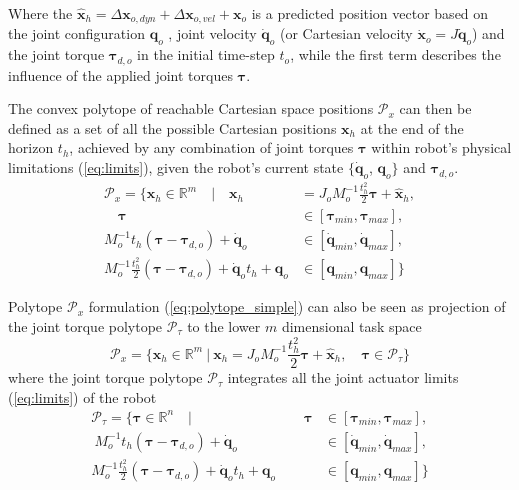 Where the $\hat{\bm{x}}_{h}\! =\!\Delta \bm{x}_{o,dyn}\! +\! \Delta \bm{x}_{o,vel} + \bm{x}_{o}$ is a predicted position vector based on the joint configuration $\bm{q}_o$ , joint velocity $\dot{\bm{q}}_o$ (or Cartesian velocity  $\dot{\bm{x}}_o\!=\!J\dot{\bm{q}}_o$) and the joint torque $\bm{\tau}_{d,o}$ in the initial time-step $t_o$, while the first term describes the influence of the applied joint torques $\bm{\tau}$.

The convex polytope of reachable Cartesian space positions $\mathcal{P}_x$ can then be defined as a set of all the possible Cartesian positions $\bm{x}_{h}$ at the end of the horizon $t_h$, achieved by any combination of joint torques $\bm{\tau}$ within robot's physical limitations (\ref{eq:limits}), given the robot's current state $\{\dot{\bm{q}}_o$, $\bm{q}_o\}$ and $\bm{\tau}_{d,o}$.
\begin{equation}
\begin{split}
    \mathcal{P}_x= \{ \bm{x}_{h} \in \mathbb{R}^m \quad| \quad \bm{x}_{h} &= J_o M_o^{-1}\frac{t_h^2}{2}\bm{\tau} + \hat{\bm{x}}_{h},\\
    \quad \bm{\tau} &\in \left[\bm{\tau}_{min},\bm{\tau}_{max}\right],\\
   M_o^{-1}t_h (\bm{\tau} - \bm{\tau}_{d,o}) + \dot{\bm{q}}_o &\in \left[\dot{\bm{q}}_{min},\dot{\bm{q}}_{max}\right],\\
   M_o^{-1}\frac{t_h^2}{2}(\bm{\tau} - \bm{\tau}_{d,o}) +  \dot{\bm{q}}_ot_h + \bm{q}_o &\in \left[\bm{q}_{min},\bm{q}_{max}\right] \}
\end{split} 
\label{eq:polytope_simple}
\end{equation}

Polytope $\mathcal{P}_x$ formulation (\ref{eq:polytope_simple}) can also be seen as projection of the joint torque polytope $\mathcal{P}_\tau$ to the lower $m$ dimensional task space
\begin{equation}
    \mathcal{P}_x= \{ \bm{x}_{h} \in \mathbb{R}^m ~| ~ \bm{x}_{h} = J_o M_o^{-1}\frac{t_h^2}{2}\bm{\tau} + \hat{\bm{x}}_{h},\quad \bm{\tau}\in\mathcal{P}_\tau\}
\end{equation}
where the joint torque polytope $\mathcal{P}_\tau$ integrates all the joint actuator limits (\ref{eq:limits}) of the robot
\begin{equation}
\begin{split}
    \mathcal{P}_\tau= \{ \bm{\tau} \in \mathbb{R}^n \quad|\qquad\qquad\qquad\qquad \bm{\tau} &\in \left[\bm{\tau}_{min},\bm{\tau}_{max}\right],\\~
   M_o^{-1}t_h (\bm{\tau} - \bm{\tau}_{d,o}) + \dot{\bm{q}}_o &\in \left[\dot{\bm{q}}_{min},\dot{\bm{q}}_{max}\right],\\
   M_o^{-1}\frac{t_h^2}{2}(\bm{\tau} - \bm{\tau}_{d,o}) +  \dot{\bm{q}}_ot_h + \bm{q}_o &\in \left[\bm{q}_{min},\bm{q}_{max}\right] \}
\end{split} 
\label{eq:torqe_poly_rs}
\end{equation}

